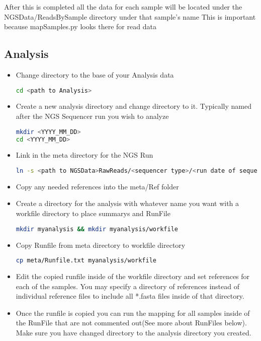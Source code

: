 \documentclass{article}
\begin{document}
After this is completed all the data for each sample will be located under the NGSData/ReadsBySample directory under that sample's name
This is important because mapSamples.py looks there for read data

\subsection{Analysis}
\begin{itemize}
\item Change directory to the base of your Analysis data
{\tiny
\begin{lstlisting}[language=bash]
cd <path to Analysis>
\end{lstlisting}
}
\item Create a new analysis directory and change directory to it. Typically named after the NGS Sequencer run you wish to analyze
{\tiny
\begin{lstlisting}[language=bash]
mkdir <YYYY_MM_DD>
cd <YYYY_MM_DD>
\end{lstlisting}
}
\item Link in the meta directory for the NGS Run
{\tiny
\begin{lstlisting}[language=bash]
ln -s <path to NGSData>RawReads/<sequencer type>/<run date of sequencer>/meta .
\end{lstlisting}
}
\item Copy any needed references into the meta/Ref folder
\item Create a directory for the analysis with whatever name you want with a workfile directory to place summarys and RunFile
{\tiny
\begin{lstlisting}[language=bash]
mkdir myanalysis && mkdir myanalysis/workfile
\end{lstlisting}
}
\item Copy Runfile from meta directory to workfile directory
{\tiny
\begin{lstlisting}[language=bash]
cp meta/Runfile.txt myanalysis/workfile
\end{lstlisting}
}
\item Edit the copied runfile inside of the workfile directory and set references for each of the samples. You may specify a directory of references instead of individual reference files to include all *.fasta files inside of that directory.
\item Once the runfile is copied you can run the mapping for all samples inside of the RunFile that are not commented out(See more about RunFiles below). Make sure you have changed directory to the analysis directory you created.

\end{itemize}
\end{document}
